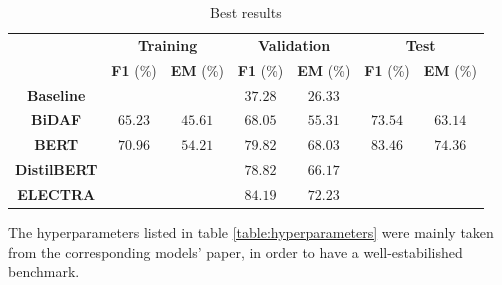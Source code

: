 \documentclass[a4paper,10pt]{report}
\begin{document}
\begin{table}[h]
  \center
  \begin{tabular}{|c|c|c|c|c|c|c|}
    \hline
    \multirow{2}{*}{}   & \multicolumn{2}{c|}{\textbf{Training}} & \multicolumn{2}{c|}{\textbf{Validation}} & \multicolumn{2}{c|}{\textbf{Test}}                                                          \\ \cline{2-7}
                        & \textbf{F1} (\%)                       & \textbf{EM} (\%)                         & \textbf{F1} (\%)                   & \textbf{EM} (\%) & \textbf{F1} (\%) & \textbf{EM} (\%) \\ \hline
    \textbf{Baseline}   &                                        &                                          & $37.28$                            & $26.33$          &                  &                  \\ \hline
    \textbf{BiDAF}      & $65.23$                                & $45.61$                                  & $68.05$                            & $55.31$          & $73.54$          & $63.14$          \\ \hline
    \textbf{BERT}       & $70.96$                                & $54.21$                                  & $79.82$                            & $68.03$          & $83.46$          & $74.36$          \\ \hline
    \textbf{DistilBERT} &                                        &                                          & $78.82$                            & $66.17$          &                  &                  \\ \hline
    \textbf{ELECTRA}    &                                        &                                          & $84.19$                            & $72.23$          &                  &                  \\ \hline
  \end{tabular}
  \caption{Best results}
  \label{table:results}
\end{table}

The hyperparameters listed in table \ref{table:hyperparameters} were mainly taken from the corresponding models' paper, in order to have a well-estabilished benchmark.
\end{document}
